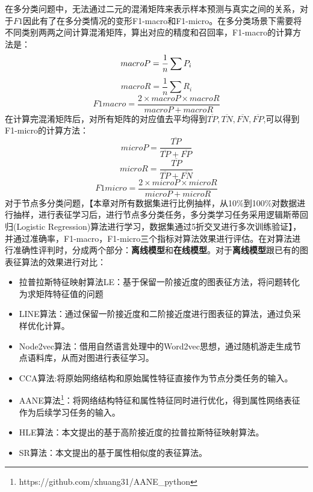 在多分类问题中，无法通过二元的混淆矩阵来表示样本预测与真实之间的关系，对于$F1$因此有了在多分类情况的变形F1-macro和F1-micro。在多分类场景下需要将不同类别两两之间计算混淆矩阵，算出对应的精度和召回率，F1-macro的计算方法是：
\begin{equation}
	macro\-P = \frac{1}{n}\sum P_i
\end{equation}
\begin{equation}
macroR = \frac{1}{n}\sum R_i
\end{equation}
\begin{equation}
F1macro = \frac{2\times macroP\times macroR}{macroP+macroR}
\end{equation}
在计算完混淆矩阵后，对所有矩阵的对应值去平均得到$\overline{TP}, \overline{TN}, \overline{FN},\overline{FP}$,可以得到F1-micro的计算方法：
\begin{equation}
microP = \frac{\overline{TP}}{\overline{TP}+\overline{FP}}
\end{equation}
\begin{equation}
microR = \frac{\overline{TP}}{\overline{TP}+\overline{FN}}
\end{equation}
\begin{equation}
F1micro = \frac{2\times microP\times microR}{microP+microR}
\end{equation}
对于节点多分类问题，【本章对所有数据集进行比例抽样，从10\%到100\%对数据进行抽样，进行表征学习后，进行节点多分类任务，多分类学习任务采用逻辑斯蒂回归(Logistic Regression)算法进行学习，数据集通过5折交叉进行多次训练验证】，并通过准确率，F1-macro，F1-micro三个指标对算法效果进行评估。在对算法进行准确性评判时，分成两个部分：\textbf{离线模型}和\textbf{在线模型}。对于\textbf{离线模型}跟已有的图表征算法的效果进行对比：
\begin{itemize}
	\item 拉普拉斯特征映射算法LE：基于保留一阶接近度的图表征方法，将问题转化为求矩阵特征值的问题
	\item LINE算法：通过保留一阶接近度和二阶接近度进行图表征的算法，通过负采样优化计算。
	\item Node2vec算法：借用自然语言处理中的Word2vec思想，通过随机游走生成节点语料库，从而对图进行表征学习。
	\item CCA算法\cite{hardoon2004canonical}:将原始网络结构和原始属性特征直接作为节点分类任务的输入。
	\item AANE算法\cite{huang2017label}\footnote{https://github.com/xhuang31/AANE\_python}：将网络结构特征和属性特征同时进行优化，得到属性网络表征作为后续学习任务的输入。
	\item HLE算法：本文提出的基于高阶接近度的拉普拉斯特征映射算法。
	\item SR算法：本文提出的基于属性相似度的表征算法。
\end{itemize}
